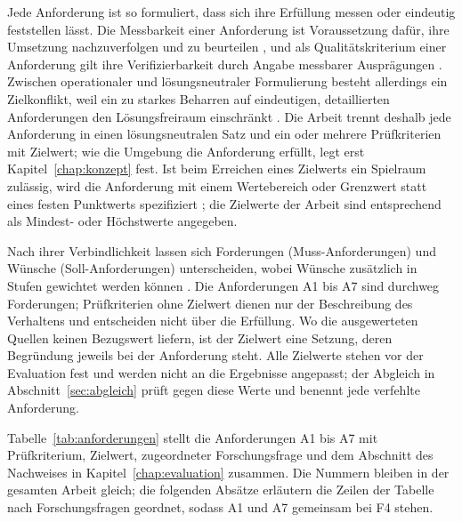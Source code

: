 Jede Anforderung ist so formuliert, dass sich ihre Erfüllung messen oder eindeutig feststellen lässt.
Die Messbarkeit einer Anforderung ist Voraussetzung dafür, ihre Umsetzung nachzuverfolgen und zu beurteilen \cite{Bender2021}, und als Qualitätskriterium einer Anforderung gilt ihre Verifizierbarkeit durch Angabe messbarer Ausprägungen \cite{Bender2021}.
Zwischen operationaler und lösungsneutraler Formulierung besteht allerdings ein Zielkonflikt, weil ein zu starkes Beharren auf eindeutigen, detaillierten Anforderungen den Lösungsfreiraum einschränkt \cite{Bender2021}.
Die Arbeit trennt deshalb jede Anforderung in einen lösungsneutralen Satz und ein oder mehrere Prüfkriterien mit Zielwert; wie die Umgebung die Anforderung erfüllt, legt erst Kapitel~\ref{chap:konzept} fest.
Ist beim Erreichen eines Zielwerts ein Spielraum zulässig, wird die Anforderung mit einem Wertebereich oder Grenzwert statt eines festen Punktwerts spezifiziert \cite{Bender2021}; die Zielwerte der Arbeit sind entsprechend als Mindest- oder Höchstwerte angegeben.

Nach ihrer Verbindlichkeit lassen sich Forderungen (Muss-Anforderungen) und Wünsche (Soll-Anforderungen) unterscheiden, wobei Wünsche zusätzlich in Stufen gewichtet werden können \cite{Bender2021}.
Die Anforderungen A1 bis A7 sind durchweg Forderungen; Prüfkriterien ohne Zielwert dienen nur der Beschreibung des Verhaltens und entscheiden nicht über die Erfüllung.
Wo die ausgewerteten Quellen keinen Bezugswert liefern, ist der Zielwert eine Setzung, deren Begründung jeweils bei der Anforderung steht.
Alle Zielwerte stehen vor der Evaluation fest und werden nicht an die Ergebnisse angepasst; der Abgleich in Abschnitt~\ref{sec:abgleich} prüft gegen diese Werte und benennt jede verfehlte Anforderung.

Tabelle~\ref{tab:anforderungen} stellt die Anforderungen A1 bis A7 mit Prüfkriterium, Zielwert, zugeordneter Forschungsfrage und dem Abschnitt des Nachweises in Kapitel~\ref{chap:evaluation} zusammen.
Die Nummern bleiben in der gesamten Arbeit gleich; die folgenden Absätze erläutern die Zeilen der Tabelle nach Forschungsfragen geordnet, sodass A1 und A7 gemeinsam bei F4 stehen.

